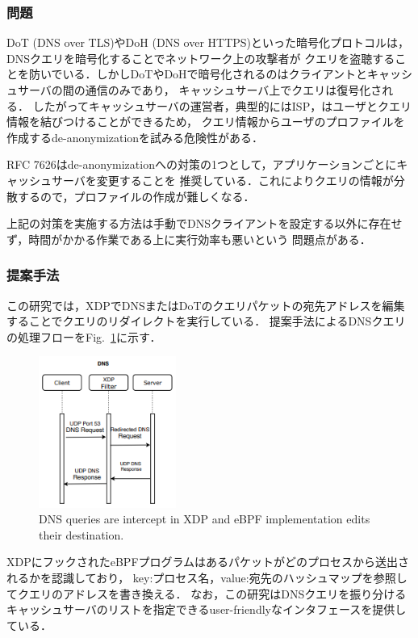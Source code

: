 \documentclass[platex,a4j,10pt,twoside,twocolumn,dvipdfmx]{jsarticle}
\newcommand{\Fref}[1]{Fig.~\ref{#1}}
\begin{document}
\subsubsection{問題}
DoT (DNS over TLS)やDoH (DNS over HTTPS)といった暗号化プロトコルは，DNSクエリを暗号化することでネットワーク上の攻撃者が
クエリを盗聴することを防いでいる．しかしDoTやDoHで暗号化されるのはクライアントとキャッシュサーバの間の通信のみであり，
キャッシュサーバ上でクエリは復号化される．
したがってキャッシュサーバの運営者，典型的にはISP，はユーザとクエリ情報を結びつけることができるため，
クエリ情報からユーザのプロファイルを作成するde-anonymizationを試みる危険性がある．

RFC 7626はde-anonymizationへの対策の1つとして，アプリケーションごとにキャッシュサーバを変更することを
推奨している．これによりクエリの情報が分散するので，プロファイルの作成が難しくなる．

上記の対策を実施する方法は手動でDNSクライアントを設定する以外に存在せず，時間がかかる作業である上に実行効率も悪いという
問題点がある．

\subsubsection{提案手法}
この研究では，XDPでDNSまたはDoTのクエリパケットの宛先アドレスを編集することでクエリのリダイレクトを実行している．
提案手法によるDNSクエリの処理フローを\Fref{img:dns-process}に示す．
\begin{figure}[tp]
  \begin{center}
    \includegraphics[width=45mm]{./img/dns-process.png}
  \end{center}
  \caption{DNS queries are intercept in XDP and eBPF implementation edits their destination. \cite{rivera2020leveraging}}
  \label{img:dns-process}
\end{figure}
XDPにフックされたeBPFプログラムはあるパケットがどのプロセスから送出されるかを認識しており，
key:プロセス名，value:宛先のハッシュマップを参照してクエリのアドレスを書き換える．
なお，この研究はDNSクエリを振り分けるキャッシュサーバのリストを指定できるuser-friendlyなインタフェースを提供している．
\end{document}
